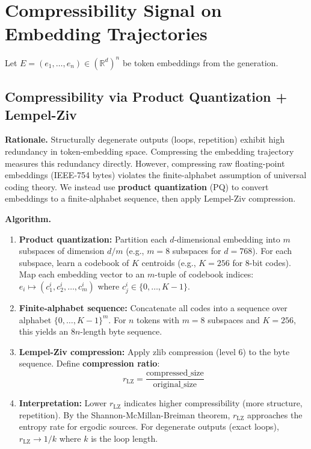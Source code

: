 \documentclass[11pt]{article}
\begin{document}
\section{Compressibility Signal on Embedding Trajectories}
\label{sec:signals}

Let $E=(e_1,\dots,e_n)\in(\mathbb{R}^d)^n$ be token embeddings from the generation.

\subsection{Compressibility via Product Quantization + Lempel-Ziv}
\label{sec:signal-rlz}

\textbf{Rationale.} Structurally degenerate outputs (loops, repetition) exhibit high redundancy in token-embedding space. Compressing the embedding trajectory measures this redundancy directly. However, compressing raw floating-point embeddings (IEEE-754 bytes) violates the finite-alphabet assumption of universal coding theory. We instead use \textbf{product quantization} (PQ) to convert embeddings to a finite-alphabet sequence, then apply Lempel-Ziv compression.

\textbf{Algorithm.}
\begin{enumerate}
\item \textbf{Product quantization:} Partition each $d$-dimensional embedding into $m$ subspaces of dimension $d/m$ (e.g., $m=8$ subspaces for $d=768$). For each subspace, learn a codebook of $K$ centroids (e.g., $K=256$ for 8-bit codes). Map each embedding vector to an $m$-tuple of codebook indices: $e_i \mapsto (c_1^i, c_2^i, \dots, c_m^i)$ where $c_j^i \in \{0,\dots,K-1\}$.

\item \textbf{Finite-alphabet sequence:} Concatenate all codes into a sequence over alphabet $\{0,\dots,K-1\}^m$. For $n$ tokens with $m=8$ subspaces and $K=256$, this yields an 8$n$-length byte sequence.

\item \textbf{Lempel-Ziv compression:} Apply zlib compression (level 6) to the byte sequence. Define \textbf{compression ratio}:
\begin{equation}
r_{\text{LZ}} = \frac{\text{compressed\_size}}{\text{original\_size}}
\end{equation}

\item \textbf{Interpretation:} Lower $r_{\text{LZ}}$ indicates higher compressibility (more structure, repetition). By the Shannon-McMillan-Breiman theorem, $r_{\text{LZ}}$ approaches the entropy rate for ergodic sources. For degenerate outputs (exact loops), $r_{\text{LZ}} \rightarrow 1/k$ where $k$ is the loop length.
\end{enumerate}
\end{document}
